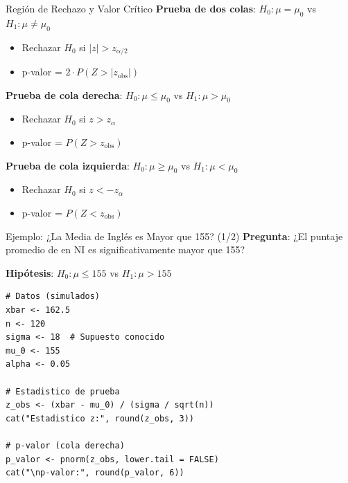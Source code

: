 \documentclass[aspectratio=169, 11pt]{beamer}
\begin{document}
\begin{frame}{Región de Rechazo y Valor Crítico}
\textbf{Prueba de dos colas}: $H_0: \mu = \mu_0$ vs $H_1: \mu \neq \mu_0$
\begin{itemize}
  \item Rechazar $H_0$ si $|z| > z_{\alpha/2}$
  \item p-valor = $2 \cdot P(Z > |z_{\text{obs}}|)$
\end{itemize}

\vspace{0.3cm}
\textbf{Prueba de cola derecha}: $H_0: \mu \leq \mu_0$ vs $H_1: \mu > \mu_0$
\begin{itemize}
  \item Rechazar $H_0$ si $z > z_{\alpha}$
  \item p-valor = $P(Z > z_{\text{obs}})$
\end{itemize}

\vspace{0.3cm}
\textbf{Prueba de cola izquierda}: $H_0: \mu \geq \mu_0$ vs $H_1: \mu < \mu_0$
\begin{itemize}
  \item Rechazar $H_0$ si $z < -z_{\alpha}$
  \item p-valor = $P(Z < z_{\text{obs}})$
\end{itemize}
\end{frame}

\begin{frame}[fragile]{Ejemplo: ¿La Media de Inglés es Mayor que 155? (1/2)}
\textbf{Pregunta}: ¿El puntaje promedio de  en NI es significativamente mayor que 155?

\smallskip
\textbf{Hipótesis}: $H_0: \mu \leq 155$ \quad vs \quad $H_1: \mu > 155$

\begin{lstlisting}
# Datos (simulados)
xbar <- 162.5
n <- 120
sigma <- 18  # Supuesto conocido
mu_0 <- 155
alpha <- 0.05

# Estadistico de prueba
z_obs <- (xbar - mu_0) / (sigma / sqrt(n))
cat("Estadistico z:", round(z_obs, 3))

# p-valor (cola derecha)
p_valor <- pnorm(z_obs, lower.tail = FALSE)
cat("\np-valor:", round(p_valor, 6))
\end{lstlisting}
\end{frame}
\end{document}
